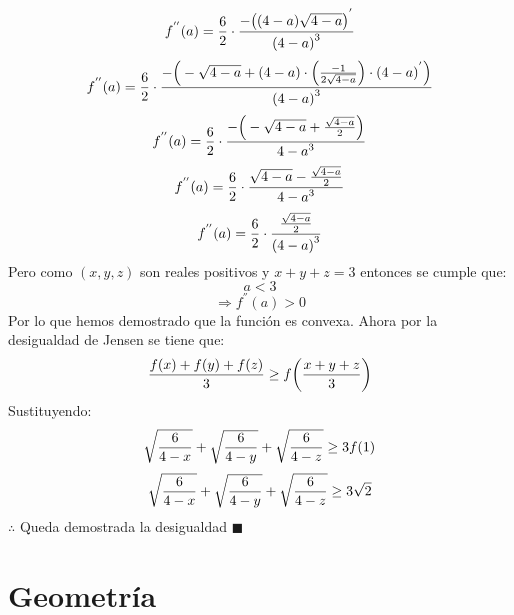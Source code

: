 \documentclass{book}
\begin{document}
\begin{enumerate}
$$f^{''} (a)={6\over 2}\cdot\frac{{-\big((4-a) \sqrt{4-a}\big)}^{'}}{{(4-a)}^3} $$
$$f^{''} (a)={6\over 2}\cdot\frac{-\Big(-\sqrt{4-a}+(4-a)\cdot\Big(\frac{-1}{2\sqrt{4-a}}\Big)\cdot{(4-a)}^{'} \Big)}{{(4-a)}^3} $$
$$f^{''} (a)={6\over 2}\cdot\frac{-\Big(-\sqrt{4-a}+\frac{\sqrt{4-a}}{2}\Big)}{{4-a}^3} $$
$$f^{''} (a)={6\over 2}\cdot\frac{\sqrt{4-a}-\frac{\sqrt{4-a}}{2}}{{4-a}^3} $$
$$f^{''} (a)={6\over 2}\cdot\frac{\frac{\sqrt{4-a}}{2}}{{(4-a)}^3} $$
Pero como $(x,y,z)$ son reales positivos y $x+y+z=3$ entonces se cumple que:
$$a<3$$
$$\Rightarrow f^{''} (a)>0$$
Por lo que hemos demostrado que la función es convexa. Ahora por la desigualdad de Jensen se tiene que:
$${f(x)+f(y)+f(z)\over 3}\geq f\bigg({x+y+z\over 3}\bigg)$$
Sustituyendo:
$$\sqrt{{6\over 4-x}}+\sqrt{{6\over 4-y}}+\sqrt{{6\over 4-z}}\geq 3f(1)$$
$$\sqrt{{6\over 4-x}}+\sqrt{{6\over 4-y}}+\sqrt{{6\over 4-z}}\geq 3\sqrt{2}$$
$\therefore$ Queda demostrada la desigualdad $\blacksquare$\\
			\end{enumerate}


			
	\chapter{Geometría}
	
\end{document}
